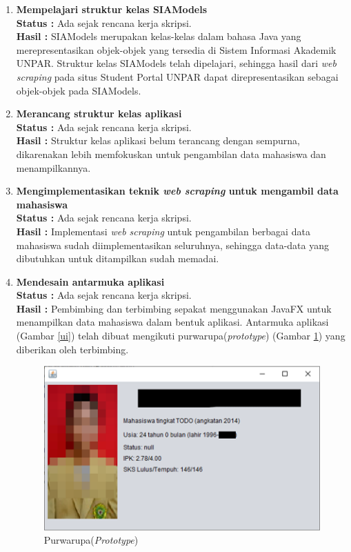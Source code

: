 \documentclass[a4paper,twoside]{article}
\begin{document}
\begin{enumerate}
        \item \textbf{Mempelajari struktur kelas SIAModels}\\
		{\bf Status :} Ada sejak rencana kerja skripsi.\\
		{\bf Hasil :} SIAModels merupakan kelas-kelas dalam bahasa Java yang merepresentasikan objek-objek yang tersedia di Sistem Informasi Akademik UNPAR.
		Struktur kelas SIAModels telah dipelajari, sehingga hasil dari \textit{web scraping} pada situs Student Portal UNPAR dapat direpresentasikan sebagai objek-objek pada SIAModels.
		
		
		\item \textbf{Merancang struktur kelas aplikasi}\\
		{\bf Status :} Ada sejak rencana kerja skripsi.\\
		{\bf Hasil :} Struktur kelas aplikasi belum terancang dengan sempurna, dikarenakan lebih memfokuskan untuk pengambilan data mahasiswa dan menampilkannya.
		
		
		\item \textbf{Mengimplementasikan teknik \textit{web scraping} untuk mengambil data mahasiswa}\\
		{\bf Status :} Ada sejak rencana kerja skripsi.\\
		{\bf Hasil :} Implementasi \textit{web scraping} untuk pengambilan berbagai data mahasiswa sudah diimplementasikan seluruhnya, sehingga data-data yang dibutuhkan untuk ditampilkan sudah memadai.
		
		
		\item \textbf{Mendesain antarmuka aplikasi}\\
		{\bf Status :} Ada sejak rencana kerja skripsi.\\
		{\bf Hasil :} Pembimbing dan terbimbing sepakat menggunakan JavaFX untuk menampilkan data mahasiswa dalam bentuk aplikasi. Antarmuka aplikasi (Gambar \ref{ui}) telah dibuat mengikuti purwarupa(\textit{prototype}) (Gambar \ref{purwarupa}) yang diberikan oleh terbimbing.
		
		\begin{figure}[H]
        	\centering
        	\includegraphics{prototype.png}
        	\caption{Purwarupa(\textit{Prototype})} 
        	\label{purwarupa}
        \end{figure}
        

\end{enumerate}
\end{document}
